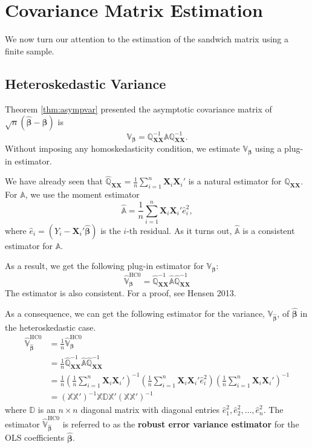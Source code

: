 \documentclass[
]{book}
\theoremstyle{definition}
\theoremstyle{definition}
\theoremstyle{definition}
\theoremstyle{definition}
\theoremstyle{remark}
\begin{document}
\hypertarget{covariance-matrix-estimation}{%
\section{Covariance Matrix Estimation}\label{covariance-matrix-estimation}}

We now turn our attention to the estimation of the sandwich matrix using a finite sample.

\hypertarget{heteroskedastic-variance}{%
\subsection{Heteroskedastic Variance}\label{heteroskedastic-variance}}

Theorem \ref{thm:asympvar} presented the asymptotic covariance matrix of
\(\sqrt{n}(\widehat{\pmb{\beta}}-\pmb{\beta})\) is
\[\mathbb{V}_{\pmb{\beta}}
=\mathbb{Q}_{\pmb{XX}}^{-1}\mathbb{A}\mathbb{Q}_{\pmb{XX}}^{-1}.\]
Without imposing any homoskedasticity condition, we estimate \(\mathbb{V}_{\pmb{\beta}}\) using a plug-in estimator.

We have already seen that \(\widehat{\mathbb{Q}}_{\pmb{XX}}=\frac{1}{n}\sum\limits_{i=1}^n\pmb{X}_i\pmb{X}_i'\) is a natural estimator for \(\mathbb{Q}_{\pmb{XX}}\). For \(\mathbb{A}\), we use the moment estimator
\[
\widehat{\mathbb{A}}=\frac{1}{n}\sum\limits_{i=1}^n\pmb{X}_i\pmb{X}_i'\widehat{e}_i^2,
\]
where \(\widehat{e}_i=(Y_i-\pmb{X}_i'\widehat{\pmb{\beta}})\) is the \(i\)-th residual. As it turns out, \(\widehat{\mathbb{A}}\) is a consistent estimator
for \(\mathbb{A}\).

As a result, we get the following plug-in estimator for \(\mathbb{V}_{\pmb{\beta}}\):
\[
\widehat{\mathbb{V}}_{\pmb{\beta}}^{\text{HC0}}=
\widehat{\mathbb{Q}}_{\pmb{XX}}^{-1}\widehat{\mathbb{A}}\widehat{\mathbb{Q}}_{\pmb{XX}}^{-1}
\]
The estimator is also consistent. For a proof, see Hensen 2013.

As a consequence, we can get the following estimator for the variance, \(\mathbb{V}_{\widehat{\pmb{\beta}}}\), of \(\widehat{\pmb{\beta}}\) in the heteroskedastic case.
\begin{align}
\widehat{\mathbb{V}}^{\text{HC0}}_{\widehat{\pmb{\beta}}}
&=\frac{1}{n}\widehat{\mathbb{V}}_{\pmb{\beta}}^{\text{HC0}} \\
&=\frac{1}{n}\widehat{\mathbb{Q}}_{\pmb{XX}}^{-1}\widehat{\mathbb{A}}\widehat{\mathbb{Q}}_{\pmb{XX}}^{-1} \\
&=\frac{1}{n}\left(\frac{1}{n}\sum\limits_{i=1}^n\pmb{X}_i\pmb{X}_i'\right)^{-1}
\left(\frac{1}{n}\sum\limits_{i=1}^n\pmb{X}_i\pmb{X}_i'\widehat{e}_i^2\right)
\left(\frac{1}{n}\sum\limits_{i=1}^n\pmb{X}_i\pmb{X}_i'\right)^{-1} \\
&=\left(\mathbb{X}\mathbb{X}'\right)^{-1}
\mathbb{X}\mathbb{D}\mathbb{X}'
\left(\mathbb{X}\mathbb{X}'\right)^{-1}
\end{align}
where \(\mathbb{D}\) is an \(n\times n\) diagonal matrix with diagonal entries \(\widehat{e}_1^2,\widehat{e}_2^2,\ldots,\widehat{e}_n^2\).
The estimator \(\widehat{\mathbb{V}}^{\text{HC0}}_{\widehat{\pmb{\beta}}}\) is referred to as the \textbf{robust error variance estimator} for the OLS coefficients \(\widehat{\pmb{\beta}}\).
\end{document}
